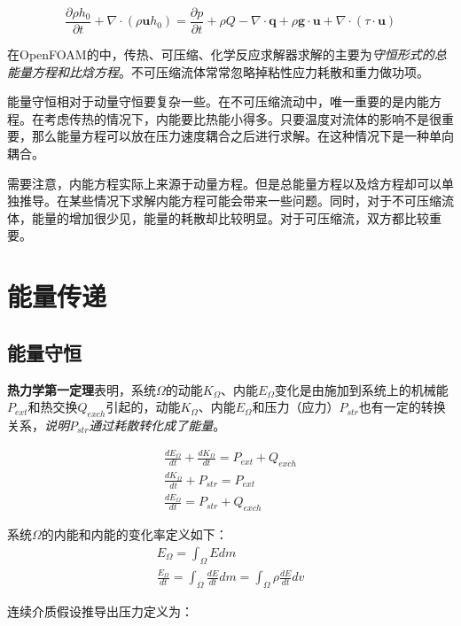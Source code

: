 \begin{equation}
\frac{\partial \rho h_0}{\partial t}+\nabla \cdot (\rho \mathbf{u} h_0) =\frac{\partial p}{\partial t}+ \rho Q - \nabla \cdot \mathbf{q} + \rho \mathbf{g} \cdot \mathbf{u}+\nabla \cdot(\tau \cdot \mathbf{u})
\end{equation}

在OpenFOAM的中，传热、可压缩、化学反应求解器求解的主要为\textit{守恒形式的总能量方程和比焓方程}。不可压缩流体常常忽略掉粘性应力耗散和重力做功项。

能量守恒相对于动量守恒要复杂一些。在不可压缩流动中，唯一重要的是内能方程。在考虑传热的情况下，内能要比热能小得多。只要温度对流体的影响不是很重要，那么能量方程可以放在压力速度耦合之后进行求解。在这种情况下是一种单向耦合。

需要注意，内能方程实际上来源于动量方程。但是总能量方程以及焓方程却可以单独推导。在某些情况下求解内能方程可能会带来一些问题。同时，对于不可压缩流体，能量的增加很少见，能量的耗散却比较明显。对于可压缩流，双方都比较重要。

\section{能量传递}

\subsection{能量守恒}
\textbf{热力学第一定理}表明，系统$\Omega$的动能$K_{\Omega}$、内能$E_{\Omega}$变化是由施加到系统上的机械能$P_{ext}$和热交换$Q_{exch}$引起的，动能$K_{\Omega}$、内能$E_{\Omega}$和压力（应力）$P_{str}$也有一定的转换关系，\textit{说明$P_{str}$通过耗散转化成了能量}。

\begin{gather}
    \frac{dE_{\Omega}}{dt} + \frac{dK_{\Omega}}{dt} = P_{ext} + Q_{exch} \\
    \frac{dK_{\Omega}}{dt} + P_{str} = P_{ext} \\
    \frac{dE_{\Omega}}{dt} = P_{str} + Q_{exch}
\end{gather}

系统$\Omega$的内能和内能的变化率定义如下：
\begin{gather}
    E_{\Omega} = \int_{\Omega} E dm \\
    \frac{E_{\Omega}}{dt} = \int_{\Omega} \frac{dE}{dt} dm = \int_{\Omega} \rho \frac{dE}{dt} dv
\end{gather}

连续介质假设推导出压力定义为：

